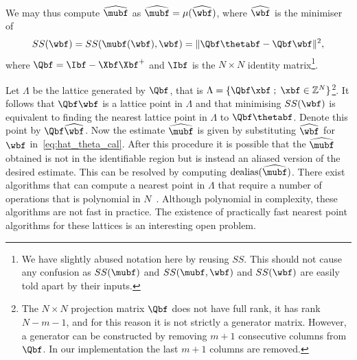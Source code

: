 \documentclass[journal]{IEEEtran}
\begin{document}
We may thus compute $\widehat{\mubf}$ as $\widehat{\mubf} = \mu(\widehat{\wbf})$, where $\widehat{\wbf}$ is the minimiser of
\[
SS(\wbf) = SS(\mubf(\wbf),\wbf) = \| \Qbf\thetabf - \Qbf\wbf \|^2,
\]
where $\Qbf = \Ibf - \Xbf\Xbf^+$ and $\Ibf$ is the $N \times N$ identity matrix\footnote{We have slightly abused notation here by reusing $SS$. This should not cause any confusion as $SS(\mubf)$ and $SS(\mubf,\wbf)$ and $SS(\wbf)$ are easily told apart by their inputs.}. 

Let $\Lambda$ be the lattice generated by $\Qbf$, that is $\Lambda = \{\Qbf\xbf \mid \xbf \in \ints^N \}$\footnote{The $N \times N$ projection matrix $\Qbf$ does not have full rank, it has rank $N-m-1$, and for this reason it is not strictly a generator matrix.  However, a generator can be constructed by removing $m+1$ consecutive columns from $\Qbf$. In our implementation the last $m+1$ columns are removed.}.  It follows that $\Qbf \wbf$ is a lattice point in $\Lambda$ and that minimising $SS(\wbf)$ is equivalent to finding the nearest lattice point in $\Lambda$ to $\Qbf\thetabf$.  Denote this point by $\Qbf\widehat{\wbf}$.  Now the estimate $\widehat{\mubf}$ is given by substituting $\widehat{\wbf}$ for $\wbf$ in~\eqref{eq:hat_theta_cal}.  After this procedure it is possible that the $\widehat{\mubf}$ obtained is not in the identifiable region but is instead an aliased version of the desired estimate. This can be resolved by computing $\dealias(\widehat{\mubf})$.  There exist algorithms that can compute a nearest point in $\Lambda$ that require a number of operations that is polynomial in $N$~\cite[Sec 4.3]{McKilliam2010thesis}.  Although polynomial in complexity, these algorithms are not fast in practice.  The existence of practically fast nearest point algorithms for these lattices is an interesting open problem.  
\end{document}
